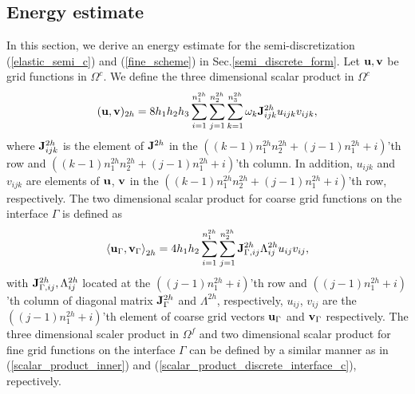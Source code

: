 \subsection{Energy estimate}\label{sec_energy}
In this section, we derive an energy estimate for the semi-discretization (\ref{elastic_semi_c}) and (\ref{fine_scheme}) in Sec.\ref{semi_discrete_form}. Let ${\bf u}, {\bf v}$ be grid functions in $\Omega^c$. We define the three dimensional scalar product in $\Omega^c$
\begin{equation}\label{scalar_product_inner}
({\bf u}, {\bf v})_{2h} = 8h_1h_2h_3\sum_{i=1}^{n_1^{2h}}\sum_{j=1}^{n_2^{2h}}\sum_{k=1}^{n_3^{2h}}\omega_k{\bf J}_{ijk}^{2h}u_{ijk}v_{ijk},
\end{equation}
where ${\bf J}^{2h}_{ijk}$ is the element of ${\bf J}^{2h}$ in the $((k-1)n_1^{2h}n_2^{2h}+(j-1)n_1^{2h}+i)$'th row and $((k-1)n_1^{2h}n_2^{2h}+(j-1)n_1^{2h}+i)$'th column. In addition, $u_{ijk}$ and $v_{ijk}$ are elements of  ${\bf u}$, ${\bf v}$ in the $((k-1)n_1^{2h}n_2^{2h}+(j-1)n_1^{2h}+i)$'th row, respectively. The two dimensional scalar product for coarse grid functions on the interface $\Gamma$ is defined as 
\begin{equation}\label{scalar_product_discrete_interface_c}
\left<{\bf u}_{\Gamma}, {\bf v}_{\Gamma}\right>_{2h} = 4h_1h_2\sum_{i=1}^{n_1^{2h}}\sum_{j=1}^{n_2^{2h}}{\bf  J}_{\Gamma,ij}^{2h}\Lambda^{2h}_{ij}u_{ij}v_{ij},
\end{equation}
with ${\bf J}^{2h}_{\Gamma,ij}, \Lambda^{2h}_{ij}$ located at the $((j-1)n_1^{2h}+i)$'th row and $((j-1)n_1^{2h}+i)$'th column of diagonal matrix ${\bf J}_{\Gamma}^{2h}$ and $\Lambda^{2h}$, respectively, $u_{ij}$, $v_{ij}$ are the $((j-1)n_1^{2h}+i)$'th element of coarse grid vectors ${\bf u}_{\Gamma}$ and ${\bf v}_{\Gamma}$ respectively. The three dimensional scaler product in $\Omega^f$ and two dimensional scalar product for fine grid functions on the interface $\Gamma$ can be defined by a similar manner as in (\ref{scalar_product_inner}) and (\ref{scalar_product_discrete_interface_c}), repectively.%

